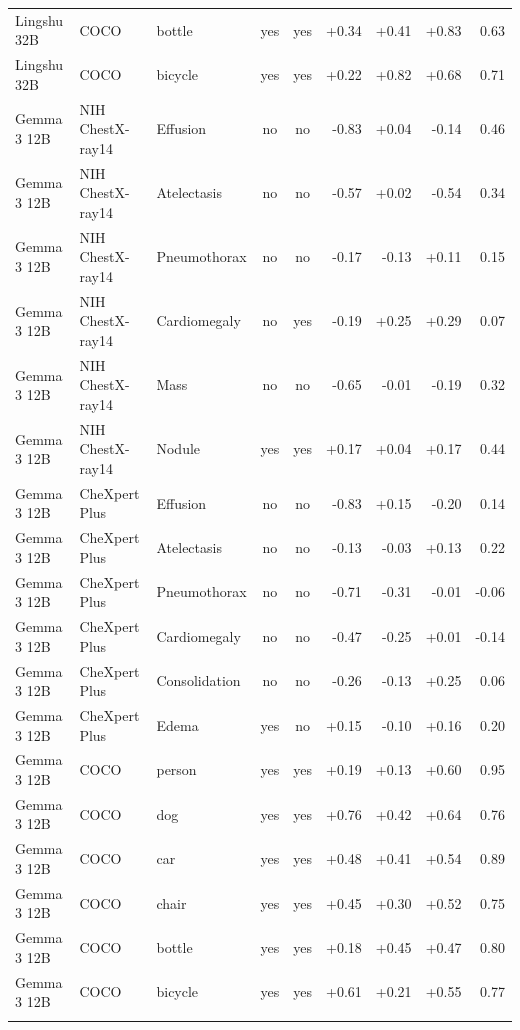 \begin{table}[p]
\begin{tabular}{lllccrrrr}
Lingshu 32B & COCO & bottle & yes & yes & +0.34 & +0.41 & +0.83 & 0.63 \\
Lingshu 32B & COCO & bicycle & yes & yes & +0.22 & +0.82 & +0.68 & 0.71 \\
\addlinespace[2pt]
Gemma 3 12B & NIH ChestX-ray14 & Effusion & no & no & -0.83 & +0.04 & -0.14 & 0.46 \\
Gemma 3 12B & NIH ChestX-ray14 & Atelectasis & no & no & -0.57 & +0.02 & -0.54 & 0.34 \\
Gemma 3 12B & NIH ChestX-ray14 & Pneumothorax & no & no & -0.17 & -0.13 & +0.11 & 0.15 \\
Gemma 3 12B & NIH ChestX-ray14 & Cardiomegaly & no & yes & -0.19 & +0.25 & +0.29 & 0.07 \\
Gemma 3 12B & NIH ChestX-ray14 & Mass & no & no & -0.65 & -0.01 & -0.19 & 0.32 \\
Gemma 3 12B & NIH ChestX-ray14 & Nodule & yes & yes & +0.17 & +0.04 & +0.17 & 0.44 \\
\addlinespace[2pt]
Gemma 3 12B & CheXpert Plus & Effusion & no & no & -0.83 & +0.15 & -0.20 & 0.14 \\
Gemma 3 12B & CheXpert Plus & Atelectasis & no & no & -0.13 & -0.03 & +0.13 & 0.22 \\
Gemma 3 12B & CheXpert Plus & Pneumothorax & no & no & -0.71 & -0.31 & -0.01 & -0.06 \\
Gemma 3 12B & CheXpert Plus & Cardiomegaly & no & no & -0.47 & -0.25 & +0.01 & -0.14 \\
Gemma 3 12B & CheXpert Plus & Consolidation & no & no & -0.26 & -0.13 & +0.25 & 0.06 \\
Gemma 3 12B & CheXpert Plus & Edema & yes & no & +0.15 & -0.10 & +0.16 & 0.20 \\
\addlinespace[2pt]
Gemma 3 12B & COCO & person & yes & yes & +0.19 & +0.13 & +0.60 & 0.95 \\
Gemma 3 12B & COCO & dog & yes & yes & +0.76 & +0.42 & +0.64 & 0.76 \\
Gemma 3 12B & COCO & car & yes & yes & +0.48 & +0.41 & +0.54 & 0.89 \\
Gemma 3 12B & COCO & chair & yes & yes & +0.45 & +0.30 & +0.52 & 0.75 \\
Gemma 3 12B & COCO & bottle & yes & yes & +0.18 & +0.45 & +0.47 & 0.80 \\
Gemma 3 12B & COCO & bicycle & yes & yes & +0.61 & +0.21 & +0.55 & 0.77 \\
\addlinespace[2pt]
\bottomrule
\end{tabular}
\end{table}
